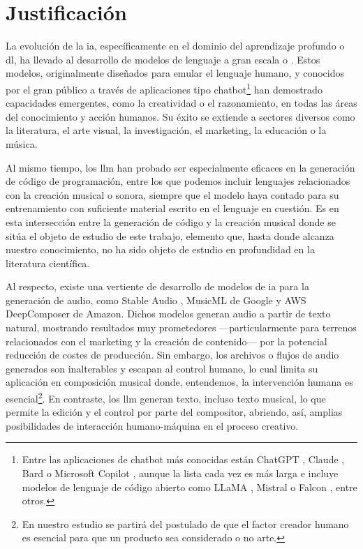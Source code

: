 \section{Justificación}



La evolución de la \gls{ia}, específicamente en el dominio del aprendizaje profundo o \gls{dl}, ha llevado al desarrollo de {modelos de lenguaje a gran escala} o . Estos modelos, originalmente diseñados para emular el lenguaje humano, y conocidos por el gran público a través de aplicaciones tipo {chatbot}\footnote{Entre las aplicaciones de {chatbot} más conocidas están {ChatGPT} \citep{IntroducingChatGPT}, {Claude} \citep{IntroducingClaude}, {Bard} \citep{BardChatbot2024} o {Microsoft Copilot} \citep{mehdiAnnouncingMicrosoftCopilot2023}, aunque la lista cada vez es más larga e incluye modelos de lenguaje de código abierto como {LLaMA} \citep{touvronLLaMAOpenEfficient2023}, {Mistral} \citep{jiangMistral7B2023} o {Falcon} \citep{almazroueiFalconSeriesOpen2023}, entre otros.} han demostrado capacidades emergentes, como la creatividad o el razonamiento, en todas las áreas del conocimiento y acción humanos. Su éxito se extiende a sectores diversos como la literatura, el arte visual, la investigación, el marketing, la educación o la música. 

Al mismo tiempo, los \gls{llm} han probado ser especialmente eficaces en la generación de código de programación, entre los que podemos incluir lenguajes relacionados con la creación musical o sonora, siempre que el modelo haya contado para su entrenamiento con suficiente material escrito en el lenguaje en cuestión. Es en esta intersección entre la generación de código y la creación musical donde se sitúa el objeto de estudio de este trabajo, elemento que, hasta donde alcanza nuestro conocimiento, no ha sido objeto de estudio en profundidad en la literatura científica.

Al respecto, existe una vertiente de desarrollo de modelos de \gls{ia} para la generación de audio, como {Stable Audio} \citep{Audio}, {MusicML} \citep{MusicLM} de Google y {AWS DeepComposer} \citep{AWSDeepComposer} de Amazon. Dichos modelos generan audio a partir de texto natural, mostrando resultados muy prometedores ---particularmente para terrenos relacionados con el marketing y la creación de contenido--- por la potencial reducción de costes de producción. Sin embargo, los archivos o flujos de audio generados son inalterables y escapan al control humano, lo cual limita su aplicación en composición musical donde, entendemos, la intervención humana es esencial\footnote{En nuestro estudio se partirá del postulado de que el factor creador humano es esencial para que un producto sea considerado o no arte.}. En contraste, los \gls{llm} generan texto, incluso texto musical, lo que permite la edición y el control por parte del compositor, abriendo, así, amplias posibilidades de interacción humano-máquina en el proceso creativo.

